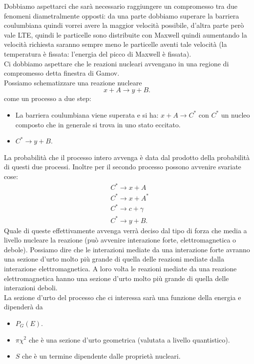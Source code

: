 Dobbiamo aspettarci che sarà necessario raggiungere un compromesso tra due fenomeni diametralmente opposti: da una parte dobbiamo superare la barriera coulumbiana quindi vorrei avere la maggior velocità possibile, d'altra parte però vale LTE, quindi le particelle sono distribuite con Maxwell quindi aumentando la velocità richiesta saranno sempre meno le particelle aventi tale velocità (la temperatura è fissata: l'energia del picco di Maxwell è fissata). \\
Ci dobbiamo aspettare che le reazioni nucleari avvengano in una regione di compromesso detta finestra di Gamov.\\
Possiamo schematizzare una reazione nucleare 
\[
x+A\to y+B
.\] 
come un processo a due step:
\begin{itemize}
    \item La barriera coulumbiana viene superata e si ha: $x+A\to C^*$ con $C^*$ un nucleo composto che in generale si trova in uno stato eccitato.
    \item $C^* \to y+B$.
\end{itemize}
La probabilità che il processo intero avvenga è data dal prodotto della probabilità di questi due processi. Inoltre per il secondo processo possono avvenire svariate cose: 
\[\begin{aligned}
    &C^*\to x+A \\
    &C^*\to x+A^*\\
    &C^*\to c+\gamma\\
    &C^*\to y+B
.\end{aligned}\]
Quale di queste effettivamente avvenga verrà deciso dal tipo di forza che media a livello nucleare la reazione (può avvenire interazione forte, elettromagnetica o debole). Possiamo dire che le interazioni mediate da una interazione forte avranno una sezione d'urto molto più grande di quella delle reazioni mediate dalla interazione elettromagnetica. A loro volta le reazioni mediate da una reazione elettromagnetica hanno una sezione d'urto molto più grande di quella delle interazioni deboli.\\
La sezione d'urto del processo che ci interessa sarà una funzione della energia e dipenderà da
\begin{itemize}
    \item $P_G(E)$.
    \item $\pi\chi^2$ che è una sezione d'urto geometrica (valutata a livello quantistico).
    \item $S$ che è un termine dipendente dalle proprietà nucleari. 
\end{itemize}
